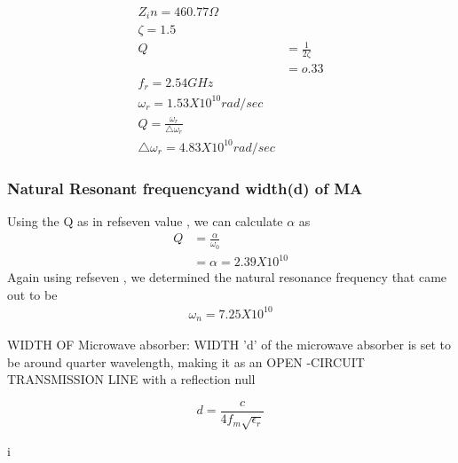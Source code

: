 \documentclass[journal]{IEEEtran}
\begin{document}
\begin{align} 
 Z_in = 460.77 \Omega \\
\zeta = 1.5  \\
Q &= \frac{1}{2 \zeta}  \\
 &=  o.33 \label{seven} \\ 
f_r = 2.54 GHz   \\
\omega_r = 1.53 X 10^{10} rad/sec \\
Q = \frac{\omega_r}{\triangle  \omega_r} \\
\triangle \omega_r = 4.83 X 10^{10} rad/sec
\end{align}

\subsubsection{Natural Resonant frequencyand width(d) of MA}
Using the Q as in ref{seven} value , we can calculate $ \alpha$ as 
\begin{align} 
Q &= \frac{\alpha}{\omega_0}\\
 &= \alpha = 2.39 X 10^{10} \label{polar}
\end{align}
Again using ref{seven} , we determined the natural resonance frequency that came out to be 
\begin{align*}
\omega_n = 7.25 X 10^{10}
\end{align*}
\hfill


WIDTH OF Microwave absorber: WIDTH 'd' of the
 microwave absorber is set to be around quarter wavelength, 
 making it as an OPEN -CIRCUIT TRANSMISSION LINE with a reflection null

\begin{equation} \label{nine}
d  = \dfrac{c}{4 f_m \sqrt{\epsilon_r}} 
\end{equation}

i%
\end{document}
